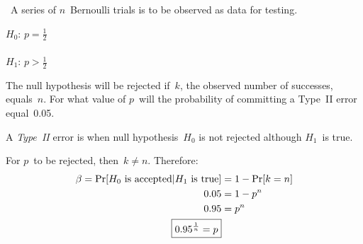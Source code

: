 \begin{problem}
  ~A series of $n$~Bernoulli trials is to be observed as data for testing.
  \begin{center}
    $H_0$: $p = \frac{1}{2}$ \\
     \\
    $H_1$: $p > \frac{1}{2}$ \\
  \end{center}
  \noindent
  The null hypothesis will be rejected if~$k$, the observed number of successes, equals~$n$.  For what value of $p$~will the probability of committing a Type~II error equal~0.05.
\end{problem}

A \textit{Type~II} error is when null hypothesis~$H_0$ is not rejected although $H_1$~is true.

For $p$~to be rejected, then~${k \ne n}$.  Therefore:
\begin{align*}
  \beta = \Pr\lbrack H_0 \text{ is accepted} \vert H_1 \text{ is true}\rbrack &= 1 - \Pr\lbrack k = n\rbrack \\
            0.05 &= 1 - p^n \\
            0.95 &= p^n \\
            \boxed{0.95^{\frac{1}{n}} = p}
\end{align*}
